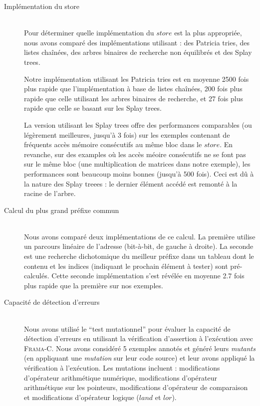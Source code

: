 \documentclass[french]{spimufcphdthesis}
\begin{document}
\begin{description}

\item[Implémentation du store] \hfill \\
Pour déterminer quelle implémentation du $store$ est la plus appropriée, nous
avons comparé des implémentations utilisant : des Patricia tries, des listes
chaînées, des arbres binaires de recherche non équilibrés et des Splay trees.

Notre implémentation utilisant les Patricia tries est en moyenne 2500 fois plus
rapide que l'implémentation à base de listes chaînées, 200 fois plus rapide que
celle utilisant les arbres binaires de recherche, et 27 fois plus rapide que
celle se basant sur les Splay trees.

La version utilisant les Splay trees offre
des performances comparables (ou légèrement meilleures, jusqu'à 3 fois) sur les
exemples contenant de fréquents accès mémoire consécutifs au même bloc dans le
$store$. En revanche, sur des examples où les accès méoire consécutifs ne se
font pas sur le même bloc (une multiplication de matrices dans notre exemple),
les performances sont beaucoup moins bonnes (jusqu'à 500 fois). Ceci est dû à
la nature des Splay treees : le dernier élément accédé est remonté à la racine
de l'arbre.

\item[Calcul du plus grand préfixe commun] \hfill \\
Nous avons comparé deux implémentations de ce calcul. La première utilise un
parcours linéaire de l'adresse (bit-à-bit, de gauche à droite). La seconde
est une recherche dichotomique du meilleur préfixe dans un tableau dont le
contenu et les indices (indiquant le prochain élément à tester) sont
pré-calculés. Cette seconde implémentation s'est révélée en moyenne 2.7 fois
plus rapide que la première sur nos exemples.

\item[Capacité de détection d'erreurs] \hfill \\
Nous avons utilisé le ``test mutationnel'' pour évaluer la capacité de détection
d'erreurs en utilisant la vérification d'assertion à l'exécution avec
\textsc{Frama-C}. Nous avons considéré 5 exemples annotés et généré leurs
{\em mutants} (en appliquant une {\em mutation} sur leur code source) et leur
avons appliqué la vérification à l'exécution. Les mutations incluent :
modifications d'opérateur arithmétique numérique, modifications d'opérateur
arithmétique sur les pointeurs, modifications d'opérateur de comparaison et
modifications d'opérateur logique ($land$ et $lor$).


\end{description}
\end{document}

